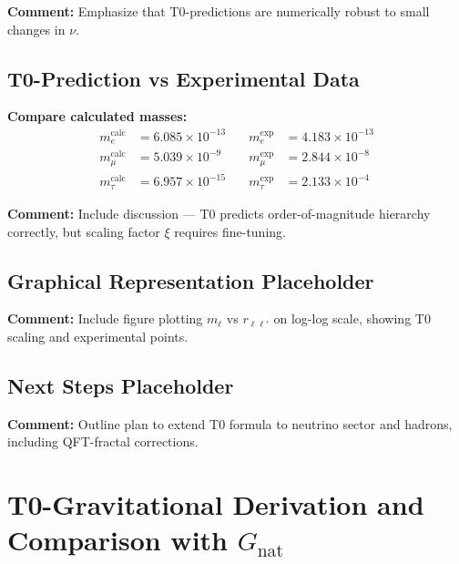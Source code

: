 \documentclass[12pt,a4paper]{article}
\newcommand{\xipar}{\xi}            %
\newcommand{\nulep}{\nu}            %
\begin{document}
\textbf{Comment:} Emphasize that T0-predictions are numerically robust to small changes in $\nulep$.

\subsection{T0-Prediction vs Experimental Data}

\textbf{Compare calculated masses:}
\begin{align}
	m_e^{\text{calc}} &= 6.085 \times 10^{-13} \quad &m_e^{\text{exp}} &= 4.183 \times 10^{-13} \\
	m_\mu^{\text{calc}} &= 5.039 \times 10^{-9} \quad &m_\mu^{\text{exp}} &= 2.844 \times 10^{-8} \\
	m_\tau^{\text{calc}} &= 6.957 \times 10^{-15} \quad &m_\tau^{\text{exp}} &= 2.133 \times 10^{-4}
\end{align}

\textbf{Comment:} Include discussion — T0 predicts order-of-magnitude hierarchy correctly, but scaling factor $\xipar$ requires fine-tuning.

\subsection{Graphical Representation Placeholder}

\textbf{Comment:} Include figure plotting $m_\ell$ vs $r_{\ell\ell'}$ on log-log scale, showing T0 scaling and experimental points.

\subsection{Next Steps Placeholder}

\textbf{Comment:} Outline plan to extend T0 formula to neutrino sector and hadrons, including QFT-fractal corrections.
\section{T0-Gravitational Derivation and Comparison with $G_{\text{nat}}$}
\end{document}
